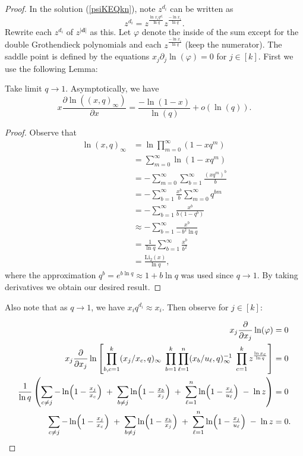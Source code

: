 \documentclass[10pt,a4paper]{amsart}
\newcommand{\db}{\boldsymbol{d}}
\begin{document}
\begin{proof}
   In the solution (\ref{psiKEQkn}), note $z^{d_i}$ can be written as
$$z^{d_i} = z^{\frac{\ln x_i q^{d_i}}{\ln q}}z^{\frac{-\ln x_i}{\ln q}}.$$
   Rewrite each $z^{d_i}$ of $z^{|\db|}$ as this.
   Let $\varphi$ denote the inside of the sum except for the double Grothendieck polynomials and each $z^{\frac{-\ln x_i}{\ln q}}$ (keep the numerator). The saddle point is defined by the equations $x_j \partial_j \ln(\varphi) =0$ for $j\in [k]$. First we use the following Lemma:

\begin{lemma}
    Take limit $q\to 1$. Asymptotically, we have
   $$x\frac{\partial \ln ((x,q)_\infty)}{\partial x} = \frac{-\ln(1-x)}{\ln(q)} +o(\ln(q)). $$
\end{lemma}
\begin{proof}
    Observe that 
    \begin{align*}
\ln (x,q)_\infty
&= \ln \prod_{m=0}^\infty (1 - x q^m) \\
&= \sum_{m=0}^\infty \ln(1 - x q^m) \\
&= - \sum_{m=0}^\infty \sum_{b=1}^\infty \frac{(x q^m)^b}{b} \\
&= - \sum_{b=1}^\infty \frac{x^b}{b} \sum_{m=0}^\infty q^{bm} \\
&= - \sum_{b=1}^\infty \frac{x^b}{b(1 - q^b)} \\
&\approx - \sum_{b=1}^\infty \frac{x^b}{-\,b^2 \ln q} \\
&= \frac{1}{\ln q} \sum_{b=1}^\infty \frac{x^b}{b^2} \\
&= \frac{\mathrm{Li}_2(x)}{\ln q},
\end{align*}
where the approximation $q^b=e^{b\ln q} \approx 1 +b\ln q$ was used since $q\to 1$. By taking derivatives we obtain our desired result.
\end{proof}
Also note that as $q\to 1$, we have $x_iq^{d_i} \approx x_i$. Then observe for $j\in [k]:$ 

\begin{align*}
x_j\frac{\partial}{\partial x_j}\ln(\varphi) &= 0\\
x_j\frac{\partial}{\partial x_j}\ln\left[\prod \limits_{b,c=1} ^k(x_j/x_c,q)_\infty\;\prod_{b=1}^k\prod_{\ell=1}^n(x_b/u_\ell ,q)_\infty^{-1}\; \prod \limits_{c=1} ^k z^{\frac{\ln x_c}{\ln q}}\right]
&=0
\\
\frac{1}{\ln q}\left(\sum_{c\neq j} -\ln\Bigl(1 - \tfrac{x_j}{x_c}\Bigr)
\;+\;
\sum_{b\neq j} \ln\Bigl(1 - \tfrac{x_b}{x_j}\Bigr)
\;+\;
\sum_{\ell=1}^n \ln\Bigl(1 - \tfrac{x_j}{u_\ell}\Bigr)
\;-\;\ln z
\right)&=0\\
\sum_{c\neq j} -\ln\Bigl(1 - \tfrac{x_j}{x_c}\Bigr)
\;+\;
\sum_{b\neq j} \ln\Bigl(1 - \tfrac{x_b}{x_j}\Bigr)
\;+\;
\sum_{\ell=1}^n \ln\Bigl(1 - \tfrac{x_j}{u_\ell}\Bigr)
\;-\;\ln z
&=0.
\end{align*}



\end{proof}
\end{document}
